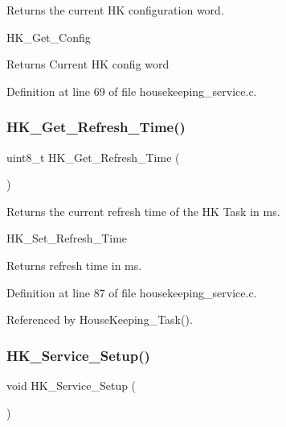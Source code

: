 Returns the current HK configuration word. 

H\+K\+\_\+\+Get\+\_\+\+Config

\begin{DoxyReturn}{Returns}
Current HK config word 
\end{DoxyReturn}


Definition at line 69 of file housekeeping\+\_\+service.\+c.

\mbox{\label{group___housekeeping___service_ga302ac334855fd8caa8f08bdb8ccd14d8}} 
\subsubsection{\texorpdfstring{H\+K\+\_\+\+Get\+\_\+\+Refresh\+\_\+\+Time()}{HK\_Get\_Refresh\_Time()}}
{\footnotesize\ttfamily uint8\+\_\+t H\+K\+\_\+\+Get\+\_\+\+Refresh\+\_\+\+Time (\begin{DoxyParamCaption}{ }\end{DoxyParamCaption})}



Returns the current refresh time of the HK Task in ms. 

H\+K\+\_\+\+Set\+\_\+\+Refresh\+\_\+\+Time \begin{DoxyReturn}{Returns}
refresh time in ms. 
\end{DoxyReturn}


Definition at line 87 of file housekeeping\+\_\+service.\+c.



Referenced by House\+Keeping\+\_\+\+Task().

\mbox{\label{group___housekeeping___service_gac59d791680b33dd9ce060d6cd1c8d503}} 
\subsubsection{\texorpdfstring{H\+K\+\_\+\+Service\+\_\+\+Setup()}{HK\_Service\_Setup()}}
{\footnotesize\ttfamily void H\+K\+\_\+\+Service\+\_\+\+Setup (\begin{DoxyParamCaption}{ }\end{DoxyParamCaption})}



